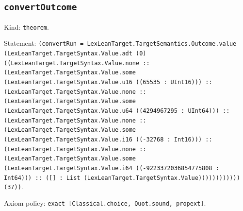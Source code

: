 \documentclass[11pt]{article}
\begin{document}
\subsection*{\texttt{convertOutcome}}
\noindent Kind: \texttt{theorem}.\par
\noindent Statement: \texttt{(convertRun = LexLeanTarget.TargetSemantics.Outcome.value (LexLeanTarget.TargetSyntax.Value.adt (0) ((LexLeanTarget.TargetSyntax.Value.none :: (LexLeanTarget.TargetSyntax.Value.some (LexLeanTarget.TargetSyntax.Value.u16 ((65535 : UInt16))) :: (LexLeanTarget.TargetSyntax.Value.none :: (LexLeanTarget.TargetSyntax.Value.some (LexLeanTarget.TargetSyntax.Value.u64 ((4294967295 : UInt64))) :: (LexLeanTarget.TargetSyntax.Value.none :: (LexLeanTarget.TargetSyntax.Value.some (LexLeanTarget.TargetSyntax.Value.i16 ((-32768 : Int16))) :: (LexLeanTarget.TargetSyntax.Value.none :: (LexLeanTarget.TargetSyntax.Value.some (LexLeanTarget.TargetSyntax.Value.i64 ((-9223372036854775808 : Int64))) :: ([] : List (LexLeanTarget.TargetSyntax.Value)))))))))))) (37))}.\par
\noindent Axiom policy: \texttt{exact [Classical.choice, Quot.sound, propext]}.\par
\end{document}
